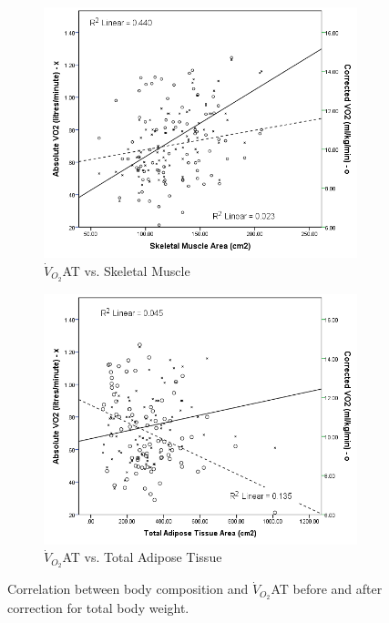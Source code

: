 \begin{figure}[htb]
	\centering
	\begin{subfigure}[b]{0.45\textwidth}
		\centering
		\includegraphics[width=\textwidth]{Figures/bc_scatter_VO2_skeletal}
		\caption{$\dot{V}_{O_2}$AT vs. Skeletal Muscle}
		\label{fig:bc_scatter_VO2_skeletal}
	\end{subfigure}
	\hfill
	\begin{subfigure}[b]{0.45\textwidth}
		\centering
		\includegraphics[width=\textwidth]{Figures/bc_scatter_VO2_TAT}
		\caption{$\dot{V}_{O_2}$AT vs. Total Adipose Tissue}
		\label{fig:bc_scatter_VO2_TAT}
	\end{subfigure}
	\caption{Correlation between body composition and $\dot{V}_{O_2}$AT before and after correction for total body weight.}	
	\label{fig:bc_scatter_VO2_bodycomp_reversal}
\end{figure}

